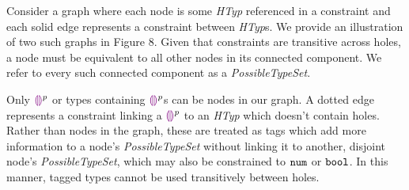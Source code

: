  Consider a graph where each node is some \textit{HTyp} referenced in a constraint and each solid edge represents a constraint between \textit{HTyp}s. We provide an illustration of two such graphs in Figure 8. Given that constraints are transitive across holes, a node must be equivalent to all other nodes in its connected component. We refer to every such connected component as a \textit{PossibleTypeSet}. 

Only $\textcolor{violet}{\llparenthesis}\textcolor{violet}{\rrparenthesis}^{p}$ or types containing $\textcolor{violet}{\llparenthesis}\textcolor{violet}{\rrparenthesis}^{p}$s can be nodes in our graph. A dotted edge represents a constraint linking a $\textcolor{violet}{\llparenthesis}\textcolor{violet}{\rrparenthesis}^{p}$ to an \textit{HTyp} which doesn't contain holes. Rather than nodes in the graph, these are treated as tags which add more information to a node's \textit{PossibleTypeSet} without linking it to another, disjoint node's \textit{PossibleTypeSet}, which may also be constrained to $\mathtt{num}$ or $\mathtt{bool}$. In this manner, tagged types cannot be used transitively between holes.





